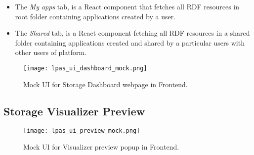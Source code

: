 \begin{itemize}
	\item The \textit{My apps} tab, is a React component that fetches all RDF resources in root \lpas{} folder containing applications created by a user. 
	\item The \textit{Shared} tab, is a React component fetching all RDF resources in a shared \lpas{} folder containing applications created and shared by a particular users with other users of \lpas{} platform.
\end{itemize}


\begin{figure}[h]
\centering
\texttt{[image: lpas\_ui\_dashboard\_mock.png]}
\caption{Mock UI for Storage Dashboard webpage in \lpa{} Frontend.}
\label{fig:lpas_ui_dashboard_mock}
\end{figure}

\subsection{Storage Visualizer Preview}


\begin{figure}[h]
\centering
\texttt{[image: lpas\_ui\_preview\_mock.png]}
\caption{Mock UI for Visualizer preview popup in \lpa{} Frontend.}
\label{fig:lpas_ui_preview_mock}
\end{figure}
